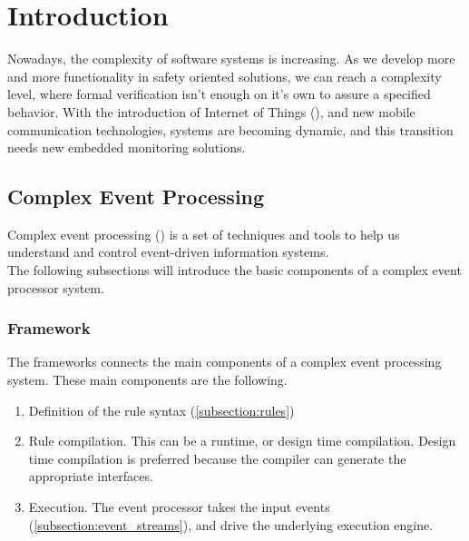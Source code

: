 \chapter{Introduction}
\label{chap:introduction}

Nowadays, the complexity of software systems is increasing. As we develop more and more functionality in safety oriented solutions, we can reach a complexity level, where formal verification isn't enough on it's own to assure a specified behavior. With the introduction of Internet of Things (), and new mobile communication technologies, systems are becoming dynamic, and this transition needs new embedded monitoring solutions.

\section{Complex Event Processing}

Complex event processing () is a set of techniques and tools to help us understand and control event-driven information systems.\citep{Luckham:2001:PEI:515781}
\\[2ex]
The following subsections will introduce the basic components of a complex event processor system.
\subsection{Framework}
The frameworks connects the main components of a complex event processing system. These main components are the following.
\begin{enumerate}
	\item Definition of the rule syntax (\cref{subsection:rules})
	\item Rule compilation. This can be a runtime, or design time compilation. Design time compilation is preferred because the compiler can generate the appropriate interfaces.
	\item Execution. The event processor takes the input events (\cref{subsection:event_streams}), and drive the underlying execution engine.
\end{enumerate}

